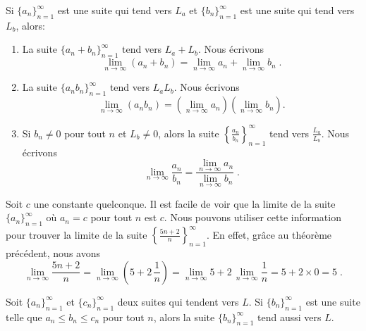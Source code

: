 {\begin{focus}{\thm} \label{suite3}
Si $\displaystyle \{ a_n\}_{n=1}^\infty$ est une suite qui tend vers
$L_a$ et $\displaystyle \{ b_n\}_{n=1}^\infty$ est une suite qui tend
vers $L_b$, alors:
\begin{enumerate}
\item La suite $\displaystyle \{ a_n + b_n \}_{n=1}^\infty$ tend vers
$L_a + L_b$.  Nous écrivons
\[
\lim_{n\rightarrow \infty} (a_n + b_n) =
\lim_{n\rightarrow \infty} a_n + \lim_{n\rightarrow \infty} b_n \; .
\]
\item La suite $\displaystyle \{ a_n b_n \}_{n=1}^\infty$ tend vers
$L_a L_b$.  Nous écrivons
\[
\lim_{n\rightarrow \infty} (a_n b_n) =
\left(\lim_{n\rightarrow \infty} a_n \right)
\left(\lim_{n\rightarrow \infty} b_n \right) .
\]
\item Si $b_n \neq 0$ pour tout $n$ et $L_b\neq 0$, alors la suite
$\displaystyle \left\{ \frac{a_n}{b_n} \right\}_{n=1}^\infty$
tend vers $\displaystyle \frac{L_a}{L_b}$.  Nous écrivons
\[
\lim_{n\rightarrow \infty} \frac{a_n}{b_n} =
\frac{\displaystyle \lim_{n\rightarrow \infty} a_n}
{\displaystyle \lim_{n\rightarrow \infty} b_n} \; .
\]
\end{enumerate}
\end{focus}

\begin{egg}
Soit $c$ une constante quelconque.  Il est facile de voir que la
limite de la suite $\displaystyle \{ a_n\}_{n=1}^\infty$ où $a_n = c$
pour tout $n$ est $c$.  Nous pouvons utiliser cette information pour
trouver la limite de la suite
$\displaystyle \left\{ \frac{5n+2}{n} \right\}_{n=1}^\infty$.  En
effet, grâce au théorème précédent, nous avons
\[
\lim_{n\rightarrow \infty} \frac{5n+2}{n}
= \lim_{n\rightarrow \infty} \left(5 + 2\,\frac{1}{n} \right)
= \lim_{n\rightarrow \infty} 5 + 2\,\lim_{n\rightarrow \infty}\frac{1}{n}
= 5 + 2 \times 0 = 5 \; .
\]
\end{egg}

\begin{focus}{\thm} \label{gendarmeS}
 
Soit
$\displaystyle \{ a_n\}_{n=1}^\infty$ et $\displaystyle \{c_n\}_{n=1}^\infty$
deux suites qui tendent vers $L$.  Si
$\displaystyle \{ b_n\}_{n=1}^\infty$ est une suite telle que 
$a_n \leq b_n \leq c_n$ pour tout $n$, alors la
suite $\displaystyle \{ b_n\}_{n=1}^\infty$ tend aussi vers $L$.
\end{focus}

}
